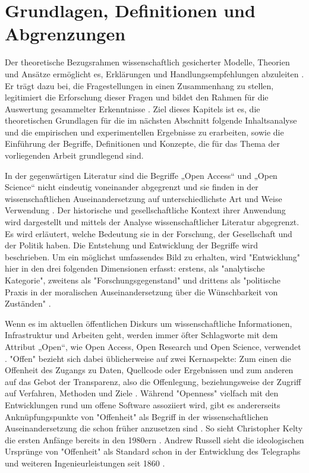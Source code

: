 \chapter{Grundlagen, Definitionen und Abgrenzungen}

Der theoretische Bezugsrahmen wissenschaftlich gesicherter Modelle, Theorien und Ansätze ermöglicht es, Erklärungen und Handlungsempfehlungen abzuleiten \cite{martin_2007_wissenschaftstheorie}. Er trägt dazu bei, die Fragestellungen in einen Zusammenhang zu stellen, legitimiert die Erforschung dieser Fragen und bildet den Rahmen für die Auswertung gesammelter Erkenntnisse \cite{suchen}. Ziel dieses Kapitels ist es, die theoretischen Grundlagen für die im nächsten Abschnitt folgende Inhaltsanalyse und die empirischen und experimentellen Ergebnisse zu erarbeiten, sowie die Einführung der Begriffe, Definitionen und Konzepte, die für das Thema der vorliegenden Arbeit grundlegend sind.

In der gegenwärtigen Literatur sind die Begriffe „Open Access“ und „Open Science“ nicht eindeutig voneinander abgegrenzt und sie finden in der wissenschaftlichen Auseinandersetzung auf unterschiedlichste Art und Weise Verwendung \cite{cite:9}. Der historische und gesellschaftliche Kontext ihrer Anwendung wird dargestellt und mittels der Analyse wissenschaftlicher Literatur abgegrenzt. Es wird erläutert, welche Bedeutung sie in der Forschung, der Gesellschaft und der Politik haben. Die Entstehung und Entwicklung der Begriffe wird beschrieben. Um ein möglichst umfassendes Bild zu erhalten, wird "Entwicklung" hier in den drei folgenden Dimensionen erfasst: erstens, als "analytische Kategorie", zweitens als "Forschungsgegenstand" und drittens als "politische Praxis in der moralischen Auseinandersetzung über die Wünschbarkeit von Zuständen" \cite{cite:10}.

Wenn es im aktuellen öffentlichen Diskurs um wissenschaftliche Informationen, Infrastruktur und Arbeiten geht, werden immer öfter Schlagworte mit dem Attribut „Open“, wie Open Access, Open Research und Open Science, verwendet \cite{bunz_2014} \cite{schulze_2013_open}. "Offen" bezieht sich dabei üblicherweise auf zwei Kernaspekte: Zum einen die Offenheit des Zugangs zu Daten, Quellcode oder Ergebnissen und zum anderen auf das Gebot der Transparenz, also die Offenlegung, beziehungsweise der Zugriff auf Verfahren, Methoden und Ziele \cite{schulze_2013_open}. Während "Openness" vielfach mit den Entwicklungen rund um offene Software assoziiert wird, gibt es andererseits Anknüpfungspunkte von "Offenheit" als Begriff in der wissenschaftlichen Auseinandersetzung die schon früher anzusetzen sind \cite{Tkacz_2014}. So sieht Christopher Kel­ty die ersten Anfänge bereits in den 1980ern \cite{kelty_2008_two_bits}. Andrew Russell sieht die ideologischen Ursprünge von "Offenheit" als Standard schon in der Entwicklung des Telegraphs und weiteren Ingenieurleistungen seit 1860 \cite{Russell_2014}.


